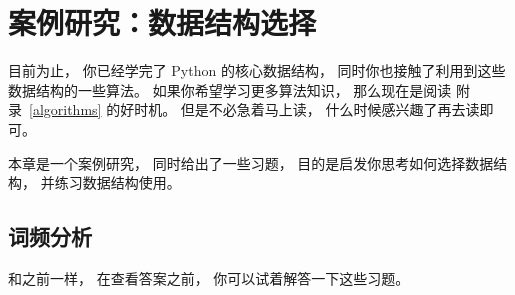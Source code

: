

\chapter{案例研究：数据结构选择}


目前为止， 你已经学完了 Python 的核心数据结构， 同时你也接触了利用到这些数据结构的一些算法。  
如果你希望学习更多算法知识， 那么现在是阅读 附录~\ref{algorithms} 的好时机。  
但是不必急着马上读， 什么时候感兴趣了再去读即可。  


本章是一个案例研究， 同时给出了一些习题， 目的是启发你思考如何选择数据结构， 并练习数据结构使用。  

\section{词频分析}
\label{analysis}


和之前一样， 在查看答案之前， 你可以试着解答一下这些习题。  

